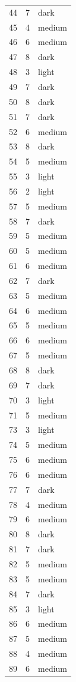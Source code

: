 \begin{tabular}{rrl}
44 & 7 & dark \\
45 & 4 & medium \\
46 & 6 & medium \\
47 & 8 & dark \\
48 & 3 & light \\
49 & 7 & dark \\
50 & 8 & dark \\
51 & 7 & dark \\
52 & 6 & medium \\
53 & 8 & dark \\
54 & 5 & medium \\
55 & 3 & light \\
56 & 2 & light \\
57 & 5 & medium \\
58 & 7 & dark \\
59 & 5 & medium \\
60 & 5 & medium \\
61 & 6 & medium \\
62 & 7 & dark \\
63 & 5 & medium \\
64 & 6 & medium \\
65 & 5 & medium \\
66 & 6 & medium \\
67 & 5 & medium \\
68 & 8 & dark \\
69 & 7 & dark \\
70 & 3 & light \\
71 & 5 & medium \\
73 & 3 & light \\
74 & 5 & medium \\
75 & 6 & medium \\
76 & 6 & medium \\
77 & 7 & dark \\
78 & 4 & medium \\
79 & 6 & medium \\
80 & 8 & dark \\
81 & 7 & dark \\
82 & 5 & medium \\
83 & 5 & medium \\
84 & 7 & dark \\
85 & 3 & light \\
86 & 6 & medium \\
87 & 5 & medium \\
88 & 4 & medium \\
89 & 6 & medium \\

\end{tabular}
